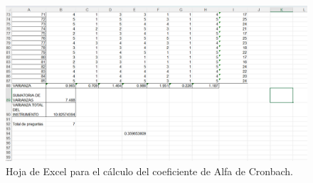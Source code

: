 \label{app:alfa-cronbach-excel}
\begin{figure}[H]
	\begin{center}
		\includegraphics[width=1\textwidth]{resources/images/excel-cronbach}
		\caption{Hoja de Excel para el cálculo del coeficiente de Alfa de Cronbach.}
	\end{center}
\end{figure}
